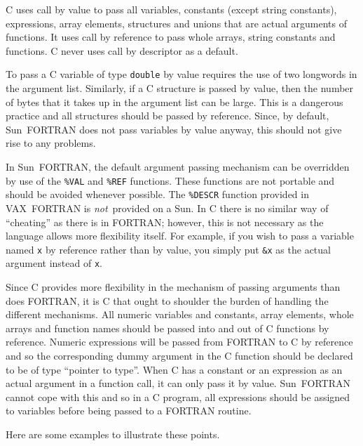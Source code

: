 \documentclass[twoside,11pt,nolof]{starlink}
\newcounter{examples}
\begin{document}
C uses call by value to pass all variables, constants (except string
constants), expressions, array elements, structures and unions that are actual
arguments of functions. It uses call by reference to pass whole arrays, string
constants and functions. C never uses call by descriptor as a default.

To pass a C variable of type \texttt{double} by value requires the use of two
longwords in the argument list. Similarly, if a C structure is passed by value,
then the number of bytes that it takes up in the argument list can be large.
This is a dangerous practice and all structures should be passed by reference.
Since, by default, Sun~FORTRAN does not pass variables by value anyway, this
should not give rise to any problems.

In Sun~FORTRAN, the default argument passing mechanism can be overridden by use
of the \texttt{\%VAL} and \texttt{\%REF} functions. These functions are not portable
and should be avoided whenever possible. The \texttt{\%DESCR} function provided in
VAX~FORTRAN is \textit{not}\, provided on a Sun. In C there is no similar way of
``cheating'' as there is in FORTRAN; however, this is not necessary as the
language allows more flexibility itself. For example, if you wish to pass a
variable named \texttt{x} by reference rather than by value, you simply put
\texttt{\&x} as the actual argument instead of \texttt{x}.

Since C provides more flexibility in the mechanism of passing arguments than
does FORTRAN, it is C that ought to shoulder the burden of handling the
different mechanisms. All numeric variables and constants, array elements,
whole arrays and function names should be passed into and out of C functions by
reference. Numeric expressions will be passed from FORTRAN to C by reference
and so the corresponding dummy argument in the C function should be declared to
be of type ``pointer to type''. When C has a constant or an expression as an
actual argument in a function call, it can only pass it by value. Sun~FORTRAN
cannot cope with this and so in a C program, all expressions should be assigned
to variables before being passed to a FORTRAN routine.

Here are some examples to illustrate these points.
\end{document}
